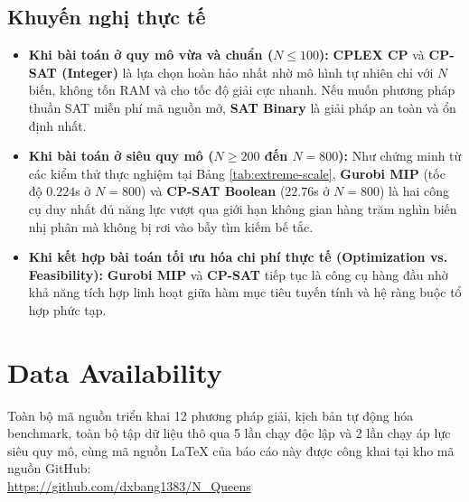 \documentclass[a4paper,11pt]{article}
\begin{document}
\subsection{Khuyến nghị thực tế}
\begin{itemize}
    \item \textbf{Khi bài toán ở quy mô vừa và chuẩn ($N \le 100$):} \textbf{CPLEX CP} và \textbf{CP-SAT (Integer)} là lựa chọn hoàn hảo nhất nhờ mô hình tự nhiên chỉ với $N$ biến, không tốn RAM và cho tốc độ giải cực nhanh. Nếu muốn phương pháp thuần SAT miễn phí mã nguồn mở, \textbf{SAT Binary} là giải pháp an toàn và ổn định nhất.
    \item \textbf{Khi bài toán ở siêu quy mô ($N \ge 200$ đến $N=800$):} Như chứng minh từ các kiểm thử thực nghiệm tại Bảng \ref{tab:extreme-scale}, \textbf{Gurobi MIP} (tốc độ $0.224$s ở $N=800$) và \textbf{CP-SAT Boolean} ($22.76$s ở $N=800$) là hai công cụ duy nhất đủ năng lực vượt qua giới hạn không gian hàng trăm nghìn biến nhị phân mà không bị rơi vào bẫy tìm kiếm bế tắc.
    \item \textbf{Khi kết hợp bài toán tối ưu hóa chi phí thực tế (Optimization vs. Feasibility):} \textbf{Gurobi MIP} và \textbf{CP-SAT} tiếp tục là công cụ hàng đầu nhờ khả năng tích hợp linh hoạt giữa hàm mục tiêu tuyến tính và hệ ràng buộc tổ hợp phức tạp.
\end{itemize}

\section*{Data Availability}
\noindent Toàn bộ mã nguồn triển khai 12 phương pháp giải, kịch bản tự động hóa benchmark, toàn bộ tập dữ liệu thô qua 5 lần chạy độc lập và 2 lần chạy áp lực siêu quy mô, cùng mã nguồn \LaTeX{} của báo cáo này được công khai tại kho mã nguồn GitHub: \\
\url{https://github.com/dxbang1383/N_Queens}
\end{document}
